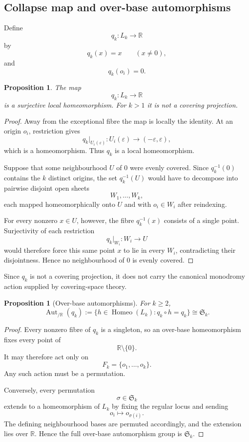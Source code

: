 \documentclass[11pt]{article}
\theoremstyle{plain}
\newtheorem{proposition}[theorem]{Proposition}
\theoremstyle{definition}
\begin{document}
\subsection{Collapse map and over-base automorphisms}
\label{subsec:Lk-collapse}

Define
\[
q_k:L_k\longrightarrow\mathbb R
\]
by
\[
q_k(x)=x
\qquad(x\neq0),
\]
and
\[
q_k(o_i)=0.
\]

\begin{proposition}
\label{prop:Lk-local-homeomorphism}
The map
\[
q_k:L_k\longrightarrow\mathbb R
\]
is a surjective local homeomorphism.  For $k>1$ it is not a covering
projection.
\end{proposition}

\begin{proof}
Away from the exceptional fibre the map is locally the identity.  At an
origin $o_i$, restriction gives
\[
q_k|_{U_i(\varepsilon)}:
U_i(\varepsilon)
\longrightarrow
(-\varepsilon,\varepsilon),
\]
which is a homeomorphism.  Thus $q_k$ is a local homeomorphism.

Suppose that some neighbourhood $U$ of $0$ were evenly covered.  Since
$q_k^{-1}(0)$ contains the $k$ distinct origins, the set
$q_k^{-1}(U)$ would have to decompose into pairwise disjoint open sheets
\[
W_1,\ldots,W_k,
\]
each mapped homeomorphically onto $U$ and with $o_i\in W_i$ after
reindexing.

For every nonzero $x\in U$, however, the fibre $q_k^{-1}(x)$ consists of
a single point.  Surjectivity of each restriction
\[
q_k|_{W_i}:W_i\to U
\]
would therefore force this same point $x$ to lie in every $W_i$,
contradicting their disjointness.  Hence no neighbourhood of $0$ is
evenly covered.
\end{proof}

Since $q_k$ is not a covering projection, it does not carry the canonical
monodromy action supplied by covering-space theory.

\begin{proposition}[Over-base automorphisms]
\label{prop:Lk-over-base-aut}
For $k\geq2$,
\[
\operatorname{Aut}_{/\mathbb R}(q_k)
:=
\{h\in\operatorname{Homeo}(L_k):q_k\circ h=q_k\}
\cong
\mathfrak S_k.
\]
\end{proposition}

\begin{proof}
Every nonzero fibre of $q_k$ is a singleton, so an over-base
homeomorphism fixes every point of
\[
\mathbb R\setminus\{0\}.
\]
It may therefore act only on
\[
F_k=\{o_1,\ldots,o_k\}.
\]
Any such action must be a permutation.

Conversely, every permutation
\[
\sigma\in\mathfrak S_k
\]
extends to a homeomorphism of $L_k$ by fixing the regular locus and
sending
\[
o_i\longmapsto o_{\sigma(i)}.
\]
The defining neighbourhood bases are permuted accordingly, and the
extension lies over $\mathbb R$.  Hence the full over-base automorphism
group is $\mathfrak S_k$.
\end{proof}
\end{document}
